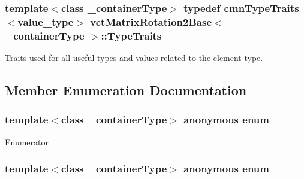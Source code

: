 \subsubsection[{Type\+Traits}]{\setlength{\rightskip}{0pt plus 5cm}template$<$class \+\_\+container\+Type$>$ typedef {\bf cmn\+Type\+Traits}$<$value\+\_\+type$>$ {\bf vct\+Matrix\+Rotation2\+Base}$<$ \+\_\+container\+Type $>$\+::{\bf Type\+Traits}}\label{classvct_matrix_rotation2_base_abd9a728263fc154b76fecac0d9c19c4d}
Traits used for all useful types and values related to the element type. 

\subsection{Member Enumeration Documentation}
\hypertarget{classvct_matrix_rotation2_base_aee21d1136c8b273c716774ceb24ea31b}{}\subsubsection[{anonymous enum}]{\setlength{\rightskip}{0pt plus 5cm}template$<$class \+\_\+container\+Type$>$ anonymous enum}\label{classvct_matrix_rotation2_base_aee21d1136c8b273c716774ceb24ea31b}
\begin{Desc}
\item[Enumerator]\par
\begin{description}
\item[{\em 
\hypertarget{classvct_matrix_rotation2_base_aee21d1136c8b273c716774ceb24ea31bad80015187d3670804554f4bd9cec3822}{}R\+O\+W\+S\label{classvct_matrix_rotation2_base_aee21d1136c8b273c716774ceb24ea31bad80015187d3670804554f4bd9cec3822}
}]\item[{\em 
\hypertarget{classvct_matrix_rotation2_base_aee21d1136c8b273c716774ceb24ea31babf5d0d692c30b7a19cc0c63d2bcc2113}{}C\+O\+L\+S\label{classvct_matrix_rotation2_base_aee21d1136c8b273c716774ceb24ea31babf5d0d692c30b7a19cc0c63d2bcc2113}
}]\end{description}
\end{Desc}
\hypertarget{classvct_matrix_rotation2_base_ac10279ed12ec787b1a4833ea02771348}{}\subsubsection[{anonymous enum}]{\setlength{\rightskip}{0pt plus 5cm}template$<$class \+\_\+container\+Type$>$ anonymous enum}\label{classvct_matrix_rotation2_base_ac10279ed12ec787b1a4833ea02771348}
